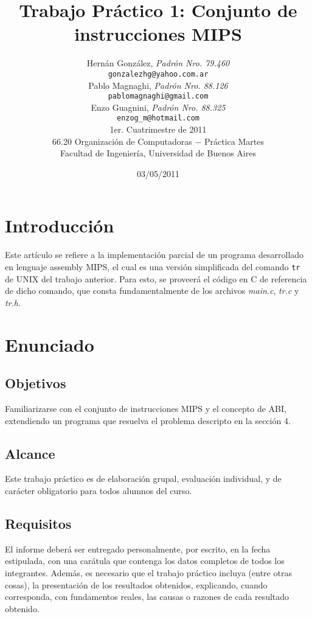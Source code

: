 \documentclass[a4paper,10pt]{article}
\title{		\textbf{Trabajo Pr\'{a}ctico 1: Conjunto de instrucciones MIPS}}
\author{	Hern\'{a}n Gonz\'{a}lez, \textit{Padr\'{o}n Nro. 79.460}		\\
            \texttt{ gonzalezhg@yahoo.com.ar }						\\[2.5ex]
            Pablo Magnaghi, \textit{Padr\'{o}n Nro. 88.126}				\\
            \texttt{ pablomagnaghi@gmail.com }						\\[2.5ex]
            Enzo Guagnini, \textit{Padr\'{o}n Nro. 88.325}				\\
            \texttt{ enzog\_m@hotmail.com }						\\[2.5ex]
            \normalsize{1er. Cuatrimestre de 2011}					\\
	    \normalsize{66.20 Organizaci\'{o}n de Computadoras  $-$ Pr\'{a}ctica Martes}\\
            \normalsize{Facultad de Ingenier\'{i}a, Universidad de Buenos Aires}	\\
       }
\date{03/05/2011}
\begin{document}
\maketitle

\thispagestyle{empty}

\newpage
\newpage

\section{Introducci\'{o}n}
Este art\'{i}culo se refiere a la implementaci\'{o}n parcial de un programa desarrollado en lenguaje assembly MIPS, el cual es una versi\'{o}n simplificada del 
comando \texttt{tr} de UNIX del trabajo anterior.
Para esto, se proveer\'{a} el c\'{o}digo en C de referencia de dicho comando, que consta fundamentalmente de los archivos \textit{main.c}, \textit{tr.c} y \textit{tr.h}.

\section{Enunciado}

\subsection{Objetivos}
Familiarizarse con el conjunto de instrucciones MIPS y el concepto de ABI, extendiendo un programa que resuelva el problema descripto en la secci\'{o}n 4.

\subsection{Alcance}
Este trabajo pr\'{a}ctico es de elaboraci\'{o}n grupal, evaluaci\'{o}n individual, y de car\'{a}cter obligatorio para todos alumnos del curso.

\subsection{Requisitos}
El informe deber\'{a} ser entregado personalmente, por escrito, en la fecha estipulada, con una  car\'{a}tula que contenga los datos completos de todos los 
integrantes. Adem\'{a}s, es necesario que el trabajo pr\'{a}ctico incluya (entre otras cosas), la presentaci\'{o}n de los resultados obtenidos, 
explicando, cuando corresponda, con fundamentos reales, las causas o razones de cada resultado obtenido.
\end{document}
